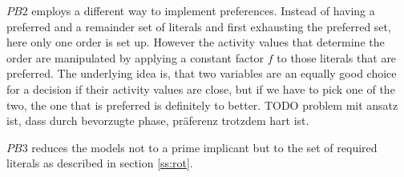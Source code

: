 $PB2$ employs a different way to implement preferences. Instead of having a preferred and a remainder set of literals and first exhausting the preferred set, here only one order is set up. However the activity values that determine the order are manipulated by applying a constant factor $f$ to those literals that are preferred. The underlying idea is, that two variables are an equally good choice for a decision if their activity values are close, but if we have to pick one of the two, the one that is preferred is definitely to better. 
TODO problem mit ansatz ist, dass durch bevorzugte phase, präferenz trotzdem hart ist.

$PB3$ reduces the models not to a prime implicant but to the set of required literals as described in section \ref{ss:rot}.



\fi





